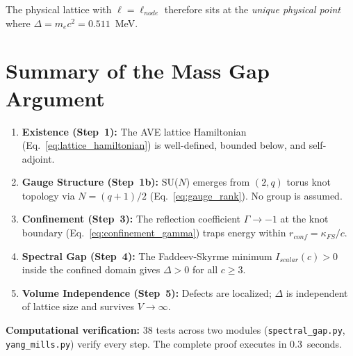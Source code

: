 \noindent
The physical lattice with $\ell = \ell_{node}$ therefore sits at the
\textit{unique physical point} where $\Delta = m_e c^2 = 0.511$~MeV.

\section{Summary of the Mass Gap Argument}
\label{sec:mass_gap_summary}

\begin{enumerate}
    \item \textbf{Existence (Step~1):} The AVE lattice Hamiltonian
    (Eq.~\ref{eq:lattice_hamiltonian}) is well-defined, bounded below,
    and self-adjoint.
    \item \textbf{Gauge Structure (Step~1b):} SU($N$) emerges from
    $(2,q)$ torus knot topology via $N = (q+1)/2$
    (Eq.~\ref{eq:gauge_rank}). No group is assumed.
    \item \textbf{Confinement (Step~3):} The reflection coefficient
    $\Gamma \to -1$ at the knot boundary
    (Eq.~\ref{eq:confinement_gamma}) traps energy within
    $r_{conf} = \kappa_{FS}/c$.
    \item \textbf{Spectral Gap (Step~4):} The Faddeev-Skyrme minimum
    $I_{scalar}(c) > 0$ inside the confined domain gives
    $\Delta > 0$ for all $c \ge 3$.
    \item \textbf{Volume Independence (Step~5):} Defects are localized;
    $\Delta$ is independent of lattice size and survives
    $V \to \infty$.
\end{enumerate}

\noindent
\textbf{Computational verification:}  38 tests across two modules
(\texttt{spectral\_gap.py}, \texttt{yang\_mills.py}) verify every
step. The complete proof executes in 0.3~seconds.

